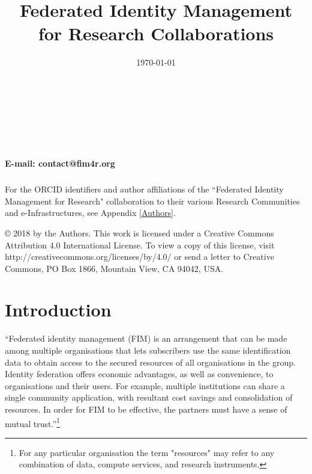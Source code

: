 \documentclass[fleqn,10pt]{wlscirep}
\title{Federated Identity Management for Research Collaborations}
\date{\today}
\begin{document}
\flushbottom


\maketitle

\thispagestyle{empty}



\noindent \\ \\ \\ \\ {\textbf{E-mail: contact@fim4r.org} \\  \\ For the ORCID{\textsuperscript{\textregistered}} identifiers and author affiliations of the ``Federated Identity Management for Research" collaboration to their various Research Communities and e-Infrastructures, see Appendix \ref{Authors}.
\newline
\newline
{}
\newline

\vfill

\noindent © 2018 by the Authors. This work is licensed under a Creative Commons Attribution 4.0 International License. To view a copy of this license, visit http://creativecommons.org/licenses/by/4.0/ or send a letter to Creative Commons, PO Box 1866, Mountain View, CA 94042, USA.

\newpage
\tableofcontents
\newpage
\section{Introduction}
“Federated identity management (FIM) is an arrangement that can be made among multiple organisations that lets subscribers use the same identification data to obtain access to the secured resources of all organisations in the group. Identity federation offers economic advantages, as well as convenience, to organisations and their users. For example, multiple institutions can share a single community application, with resultant cost savings and consolidation of resources. In order for FIM to be effective, the partners must have a sense of mutual trust.”\cite{FIM4Rv1:2012}\footnote{For any particular organisation the term "resources" may refer to any combination of data, compute services, and research instruments.} 

}
\end{document}
